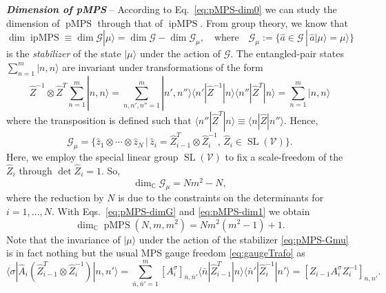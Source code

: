 \documentclass[english,11pt,aps,pra,onecolumn,tightenlines,groupedaddress,superscriptaddress,notitlepage,floatfix,fleqn]{revtex4-1}
\newcommand{\bra}{\langle}
\newcommand{\ket}{\rangle}
\newcommand{\hA}{\hat{A}}
\newcommand{\hZ}{\hat{Z}}
\newcommand{\s}{\sigma}
\newcommand{\CC}{\mathbb{C}}
\newcommand{\mc}[1]{\mathcal{#1}}
\newcommand{\V}{\mc{V}}
\newcommand{\G}{\mc{G}}
\newcommand{\pMPS}{\operatorname{pMPS}}
\newcommand{\ipMPS}{\operatorname{ipMPS}}
\newcommand{\SL}{\operatorname{SL}}
\newcommand{\Emph}[1]{\textbf{\emph{#1}}}
\begin{document}
\Emph{Dimension of pMPS} -- According to Eq.~\eqref{eq:pMPS-dim0} we can study the dimension of $\pMPS$ through that of $\ipMPS$. From group theory, we know that 
\begin{equation}\label{eq:pMPS-dim1}
	\dim \ipMPS\equiv\dim \G|\mu\ket=\dim\G-\dim\G_\mu,\quad \text{where}\quad
	\G_\mu:=\{\hat{a}\in\G\,|\,\hat{a}|\mu\ket=\mu\ket\}
\end{equation}
is the \emph{stabilizer} of the state $|\mu\ket$ under the action of $\G$. The entangled-pair states $\sum_{n=1}^m|n, n\ket$ are invariant under transformations of the form
\begin{equation}\label{eq:pMPS-Zinv}
	\hZ^{-1}\otimes\hZ^T\sum_{n=1}^m|n, n\ket
	=\sum_{n,n',n''=1}^m|n',n''\ket\bra n'|\hZ^{-1}|n\ket\bra n''|\hZ^T|n\ket
	=\sum_{n=1}^m|n,n\ket
\end{equation}
where the transposition is defined such that $\bra n''|\hZ^T|n\ket\equiv \bra n|\hZ|n''\ket$. Hence,
\begin{equation}\label{eq:pMPS-Gmu}
	\G_\mu=\{\hat{z}_1\otimes\dotsb\otimes\hat{z}_N\,|\,\hat{z}_i=\hZ^T_{i-1}\otimes\hZ^{-1}_i,\, \hZ_i\in\SL(\V)\}.
\end{equation}
Here, we employ the special linear group $\SL(\V)$ to fix a scale-freedom of the $\hZ_i$ through $\det\hZ_i=1$. So,
\begin{equation}\label{eq:pMPS-Gmu-dim}
	\dim_\CC \G_\mu=N m^2-N,
\end{equation}
where the reduction by $N$ is due to the constraints on the determinants for $i=1,\dotsc,N$. With Eqs.~\eqref{eq:pMPS-dimG} and \eqref{eq:pMPS-dim1} we obtain
\begin{equation}
	\dim_\CC\pMPS(N,m,m^2)=N m^2(m^2-1)+1.
\end{equation}
Note that the invariance of $|\mu\ket$ under the action of the stabilizer \eqref{eq:pMPS-Gmu} is in fact nothing but the usual MPS gauge freedom \eqref{eq:gaugeTrafo} as
\begin{equation}\textstyle
	\bra\s|\hA_i(\hZ^T_{i-1}\otimes\hZ^{-1}_i)|n,n'\ket
	=\sum_{\bar{n},\bar{n}'=1}^m[A^\sigma_i]_{\bar{n},\bar{n}'}\bra \bar{n}|\hZ^T_{i-1}|n\ket\bra\bar{n}'|\hZ^{-1}_i|n'\ket
	=[Z_{i-1}A^\sigma_iZ^{-1}_{i}]_{n,n'}.
\end{equation}
\end{document}
